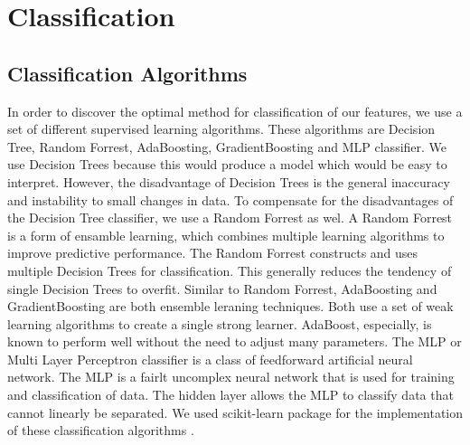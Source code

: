 \section{Classification}




\subsection{Classification Algorithms}
In order to discover the optimal method for classification of our features, we use a set of different supervised learning algorithms. These algorithms are Decision Tree, Random Forrest, AdaBoosting, GradientBoosting and MLP classifier. We use Decision Trees because this would produce a model which would be easy to interpret. However, the disadvantage of Decision Trees is the general inaccuracy and instability to small changes in data. To compensate for the disadvantages of the Decision Tree classifier, we use a Random Forrest as wel. A Random Forrest is a form of ensamble learning, which combines multiple learning algorithms to improve predictive performance. The Random Forrest constructs and uses multiple Decision Trees for classification. This generally reduces the tendency of single Decision Trees to overfit. Similar to Random Forrest, AdaBoosting and GradientBoosting are both ensemble leraning techniques. Both use a set of weak learning algorithms to create a single strong learner. AdaBoost, especially, is known to perform well without the need to adjust many parameters. The MLP  or Multi Layer Perceptron classifier is a class of feedforward artificial neural network. The MLP is a fairlt uncomplex neural network that is used for training and classification of data. The hidden layer allows the MLP to classify data that cannot linearly be separated. We used scikit-learn package for the implementation of these classification algorithms \cite{scikit-learn}.

